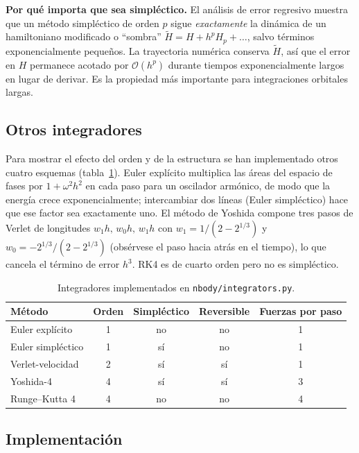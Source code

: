 \documentclass[11pt,a4paper]{article}
\begin{document}
\textbf{Por qué importa que sea simpléctico.} El análisis de error regresivo muestra que un
método simpléctico de orden $p$ sigue \emph{exactamente} la dinámica de un hamiltoniano
modificado o ``sombra'' $\tilde H=H+h^pH_p+\dots$, salvo términos exponencialmente
pequeños. La trayectoria numérica conserva $\tilde H$, así que el error en $H$ permanece
acotado por $\mathcal O(h^p)$ durante tiempos exponencialmente largos en lugar de derivar.
Es la propiedad más importante para integraciones orbitales largas.

\subsection{Otros integradores}

Para mostrar el efecto del orden y de la estructura se han implementado otros cuatro
esquemas (tabla~\ref{tab:integrators}). Euler explícito multiplica las áreas del espacio de
fases por $1+\omega^2h^2$ en cada paso para un oscilador armónico, de modo que la energía
crece exponencialmente; intercambiar dos líneas (Euler simpléctico) hace que ese factor sea
exactamente uno. El método de Yoshida compone tres pasos de Verlet de longitudes
$w_1h,\,w_0h,\,w_1h$ con $w_1=1/(2-2^{1/3})$ y $w_0=-2^{1/3}/(2-2^{1/3})$ (obsérvese el paso
hacia atrás en el tiempo), lo que cancela el término de error $h^3$. RK4 es de cuarto orden
pero no es simpléctico.

\begin{table}[H]
\centering
\caption{Integradores implementados en \texttt{nbody/integrators.py}.}
\label{tab:integrators}
\begin{tabular}{lcccc}
\toprule
Método & Orden & Simpléctico & Reversible & Fuerzas por paso\\
\midrule
Euler explícito    & 1 & no & no & 1\\
Euler simpléctico  & 1 & sí & no & 1\\
Verlet-velocidad   & 2 & sí & sí & 1\\
Yoshida-4          & 4 & sí & sí & 3\\
Runge--Kutta 4     & 4 & no & no & 4\\
\bottomrule
\end{tabular}
\end{table}

\subsection{Implementación}
\end{document}
